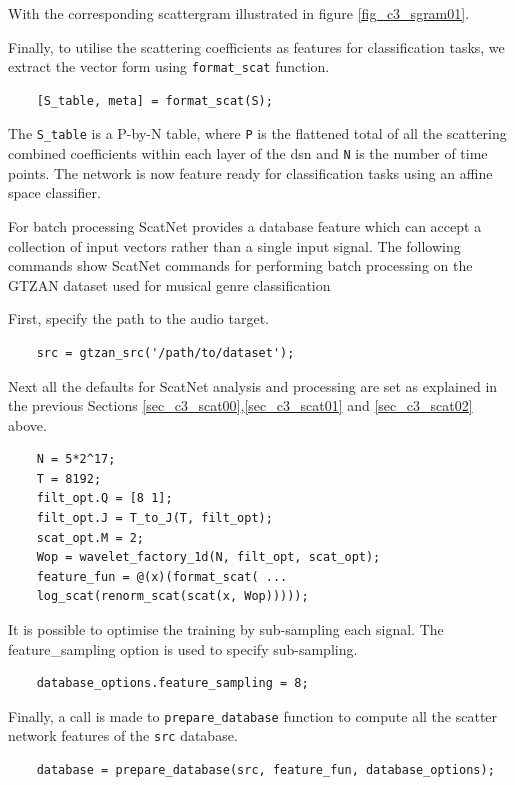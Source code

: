 With the corresponding scattergram illustrated in figure \ref{fig_c3_sgram01}.

Finally, to utilise the scattering coefficients as features for classification tasks, we extract the vector form using \texttt{format\_scat} function.
\begin{verbatim}
    [S_table, meta] = format_scat(S);
\end{verbatim}

The \texttt{S\_table} is a P-by-N table, where \texttt{P} is the flattened total of all the scattering combined coefficients within each layer of the \acrfull{dsn} and \texttt{N} is the number of time points. The network is now feature ready for classification tasks using an affine space classifier.

For batch processing ScatNet provides a database feature which can accept a collection of input vectors rather than a single input signal.  The following commands show ScatNet commands for performing batch processing on the GTZAN dataset used for musical genre classification

First, specify the path to the audio target.
\begin{verbatim}
    src = gtzan_src('/path/to/dataset');
\end{verbatim}

Next all the defaults for ScatNet analysis and processing are set as explained in the previous Sections \ref{sec_c3_scat00},\ref{sec_c3_scat01} and \ref{sec_c3_scat02} above.
\begin{verbatim}
    N = 5*2^17;
    T = 8192;
    filt_opt.Q = [8 1];
    filt_opt.J = T_to_J(T, filt_opt);
    scat_opt.M = 2;
    Wop = wavelet_factory_1d(N, filt_opt, scat_opt);
    feature_fun = @(x)(format_scat( ...
    log_scat(renorm_scat(scat(x, Wop)))));
\end{verbatim}

It is possible to optimise the training by sub-sampling each signal.  The feature\_sampling option is used to specify sub-sampling.
\begin{verbatim}
    database_options.feature_sampling = 8;
\end{verbatim}


Finally, a call is made to \texttt{prepare\_database} function to compute all the scatter network features of the \texttt{src} database.
\begin{verbatim}
    database = prepare_database(src, feature_fun, database_options);
\end{verbatim}

